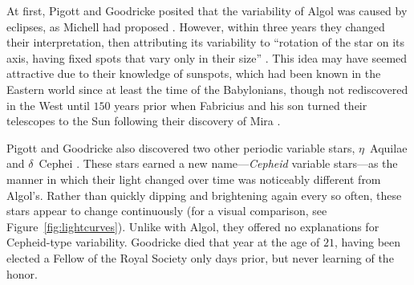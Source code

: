 At first, Pigott and Goodricke posited that the variability of Algol was caused by eclipses, as Michell had proposed \citep{10.2307/106502}. 
However, within three years they changed their interpretation, then attributing its variability to ``rotation of the star on its axis, having fixed spots that vary only in their size'' \citep{10.2307/106614}. 
This idea may have seemed attractive due to their knowledge of sunspots, which had been known in the Eastern world since at least the time of the Babylonians, though not rediscovered in the West until $150$ years prior when Fabricius and his son turned their telescopes to the Sun following their discovery of Mira \citep{1611mson.book.....F}. 


Pigott and Goodricke also discovered two other periodic variable stars, $\eta$~Aquilae and $\delta$~Cephei \citep{1785RSPT...75..127P, 10.2307/106614}. 
These stars earned a new name---\emph{Cepheid} variable stars---as the manner in which their light changed over time was noticeably different from Algol's. 
Rather than quickly dipping and brightening again every so often, these stars appear to change continuously (for a visual comparison, see Figure~\ref{fig:lightcurves}). 
Unlike with Algol, they offered no explanations for Cepheid-type variability. 
Goodricke died that year at the age of $21$, having been elected a Fellow of the Royal Society only days prior, %
but never learning of the honor. %

